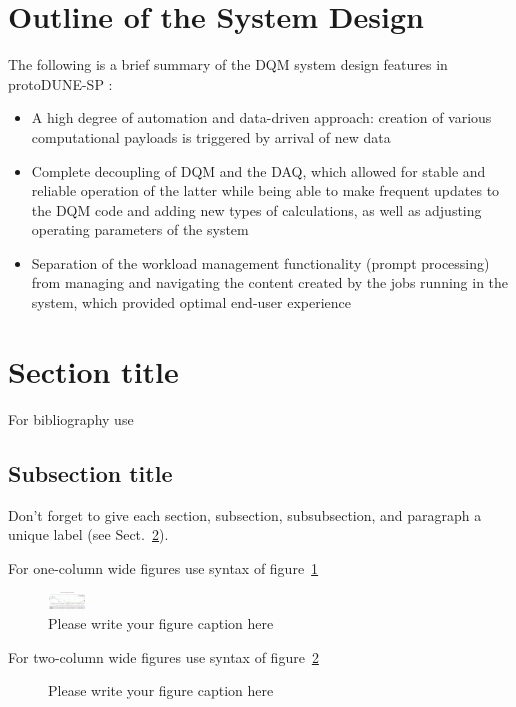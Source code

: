 \documentclass{webofc}
\newcommand{\pd}{protoDUNE\xspace}
\begin{document}
\section{Outline of the System Design}
The following is a brief summary of the DQM system design features in \pd-SP \cite{chep18}:
\begin{itemize}

\item A high degree of automation and data-driven approach: creation of various computational
payloads is triggered by arrival of new data

\item Complete decoupling of DQM and the DAQ, which allowed for stable and reliable operation of
the latter while being able to make frequent updates to the DQM code and adding new types of
calculations, as well as adjusting operating parameters of the system

\item Separation of the workload management functionality (prompt processing) from
managing and navigating the content created by the jobs running in the system, which provided
optimal end-user experience

\end{itemize}

\section{Section title}
\label{sec-1}
For bibliography use \cite{RefJ}
\subsection{Subsection title}
\label{sec-2}
Don't forget to give each section, subsection, subsubsection, and
paragraph a unique label (see Sect.~\ref{sec-1}).

For one-column wide figures use syntax of figure~\ref{fig-1}
\begin{figure}[h]
\centering
\includegraphics[width=1cm,clip]{figures/dqm_purmon_20190910_1.png}
\caption{Please write your figure caption here}
\label{fig-1}       %
\end{figure}

For two-column wide figures use syntax of figure~\ref{fig-2}
\begin{figure}
\centering
\vspace*{5cm}       %
\caption{Please write your figure caption here}
\label{fig-2}       %
\end{figure}
\end{document}
